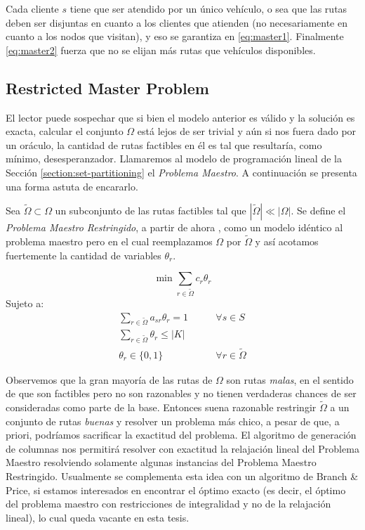Cada cliente $s$ tiene que ser atendido por un único vehículo, o sea que las rutas deben ser disjuntas en cuanto a los clientes que atienden (no necesariamente en cuanto a los nodos que visitan), y eso se garantiza en \ref{eq:master1}. Finalmente \ref{eq:master2} fuerza que no se elijan más rutas que vehículos disponibles.

\subsection{Restricted Master Problem}
\label{section:rmp}

El lector puede sospechar que si bien el modelo anterior es válido y la solución es exacta, calcular el conjunto $\Omega$ está lejos de ser trivial y aún si nos fuera dado por un oráculo, la cantidad de rutas factibles en él es tal que resultaría, como mínimo, desesperanzador. Llamaremos al modelo de programación lineal de la Sección \ref{section:set-partitioning} el \emph{Problema Maestro}. A continuación se presenta una forma astuta de encararlo.

Sea $\tilde{\Omega} \subset \Omega$ un subconjunto de las rutas factibles  tal que $|\tilde{\Omega}| \ll |\Omega|$. Se define el \emph{Problema Maestro Restringido}, a partir de ahora , como un modelo idéntico al problema maestro pero en el cual reemplazamos $\Omega$ por $\tilde{\Omega}$ y así acotamos fuertemente la cantidad de variables $\theta_r$. 

\begin{equation}
    \min \sum_{r \in \tilde{\Omega}} c_r  \theta_r
\end{equation}
Sujeto a:
\begin{align}
    \sum_{r \in \tilde{\Omega}} {a_{sr}\theta_r} = 1
\qquad & \forall {s \in S} \label{eq:rmp1} \\
\sum_{r \in \tilde{\Omega}}{\theta_r} \leq |K| & \label{eq:rmp2} \\
\theta_r \in \{0, 1\} \qquad & \forall{r \in \tilde{\Omega}}
\end{align}

Observemos que la gran mayoría de las rutas de $\Omega$ son rutas \emph{malas}, en el sentido de que son factibles pero no son razonables y no tienen verdaderas chances de ser consideradas como parte de la base. Entonces suena razonable restringir $\tilde{\Omega}$ a un conjunto de rutas \emph{buenas} y resolver un problema más chico, a pesar de que, a priori, podríamos sacrificar la exactitud del problema. El algoritmo de generación de columnas nos permitirá resolver con exactitud la relajación lineal del Problema Maestro resolviendo solamente algunas instancias del Problema Maestro Restringido. Usualmente se complementa esta idea con un algoritmo de Branch \& Price, si estamos interesados en encontrar el óptimo exacto (es decir, el óptimo del problema maestro con restricciones de integralidad y no de la relajación lineal), lo cual queda vacante en esta tesis.	

